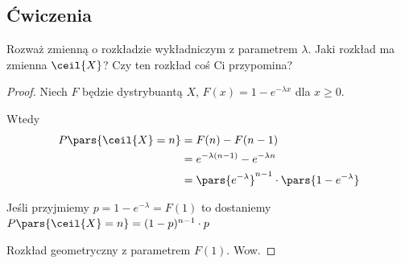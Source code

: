 \subsection{Ćwiczenia}

\begin{exercise}
	Rozważ zmienną o rozkładzie wykładniczym z parametrem \(\lambda\).
	Jaki rozkład ma zmienna \(\ceil{X}\)? Czy ten rozkład coś Ci przypomina?
\end{exercise}
\begin{proof}
	Niech \( F \) będzie dystrybuantą \( X \), \( F(x) = 1 - e^{-\lambda x} \) dla \( x \geq 0 \).

	Wtedy
	\begin{align*}
		P\pars{\ceil{X} = n}
		 & = F(n) - F(n - 1)                                         \\
		 & = e^{-\lambda(n-1)} - e^{-\lambda n}                      \\
		 & = \pars{e^{-\lambda}}^{n-1} \cdot \pars{1 - e^{-\lambda}}
	\end{align*}

	Jeśli przyjmiemy \( p = 1 - e^{-\lambda} = F(1) \) to dostaniemy \( P\pars{\ceil{X} = n} = (1-p)^{n-1} \cdot p \)

	Rozkład geometryczny z parametrem \(F(1)\). Wow.

\end{proof}

